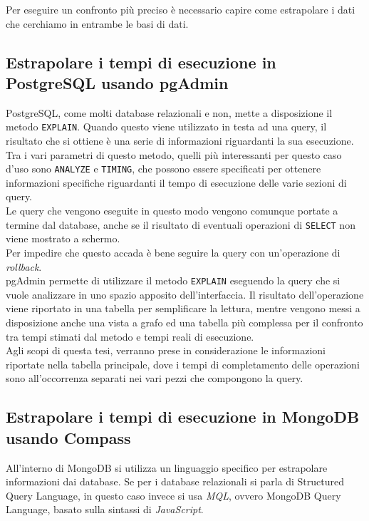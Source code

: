 Per eseguire un confronto più preciso è necessario capire come estrapolare i dati che cerchiamo in entrambe le basi di dati.

\subsection{Estrapolare i tempi di esecuzione in PostgreSQL usando pgAdmin}
PostgreSQL, come molti database relazionali e non, mette a disposizione il metodo \texttt{EXPLAIN}. Quando questo viene utilizzato in testa ad una query, il risultato che si ottiene è una serie di informazioni riguardanti la sua esecuzione. Tra i vari parametri di questo metodo, quelli più interessanti per questo caso d'uso sono \texttt{ANALYZE} e \texttt{TIMING}, che possono essere specificati per ottenere informazioni specifiche riguardanti il tempo di esecuzione delle varie sezioni di query.\\
Le query che vengono eseguite in questo modo vengono comunque portate a termine dal database, anche se il risultato di eventuali operazioni di \texttt{SELECT} non viene mostrato a schermo.\\
Per impedire che questo accada è bene seguire la query con un'operazione di \textit{rollback}.\\

\noindent pgAdmin permette di utilizzare il metodo \texttt{EXPLAIN} eseguendo la query che si vuole analizzare in uno spazio apposito dell'interfaccia. Il risultato dell'operazione viene riportato in una tabella per semplificare la lettura, mentre vengono messi a disposizione anche una vista a grafo ed una tabella più complessa per il confronto tra tempi stimati dal metodo e tempi reali di esecuzione.\\
Agli scopi di questa tesi, verranno prese in considerazione le informazioni riportate nella tabella principale, dove i tempi di completamento delle operazioni sono all'occorrenza separati nei vari pezzi che compongono la query.

\subsection{Estrapolare i tempi di esecuzione in MongoDB usando Compass}
All'interno di MongoDB si utilizza un linguaggio specifico per estrapolare informazioni dai database. Se per i database relazionali si parla di Structured Query Language, in questo caso invece si usa \textit{MQL}, ovvero MongoDB Query Language, basato sulla sintassi di \textit{JavaScript}.\\

